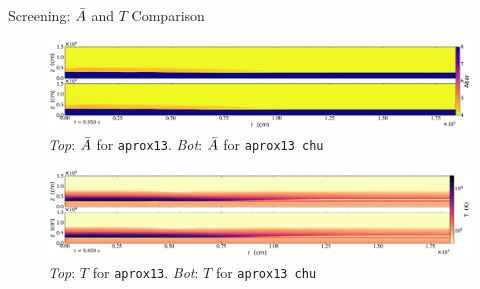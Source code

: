 \documentclass[
	11pt, %
]{beamer}
\begin{document}
\begin{frame}{Screening: $\Bar{A}$ and $T$ Comparison}
    \begin{figure}
        \centering
        \includegraphics[width=1\linewidth]{screen_abar_50ms.pdf}
        \caption{{\it Top}: $\Bar{A}$ for {\tt aprox13}. {\it Bot}: $\Bar{A}$ for {\tt aprox13 chu}}
    \end{figure}
    
    \begin{figure}
        \centering
        \includegraphics[width=1\linewidth]{screen_temp_50ms.pdf}
        \caption{{\it Top}: $T$ for {\tt aprox13}. {\it Bot}: $T$ for {\tt aprox13 chu}}
    \end{figure}
\end{frame}
\end{document}
